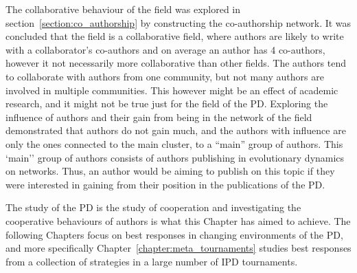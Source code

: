 The collaborative behaviour of the field was explored in
section~\ref{section:co_authorship} by constructing the co-authorship network.
It was concluded that the field is a collaborative field, where authors are
likely to write with a collaborator's co-authors and on average an author has 4
co-authors, however it not necessarily more collaborative than other fields. The
authors tend to collaborate with authors from one community, but not many
authors are involved in multiple communities. This however
might be an effect of academic research, and it might not be true just for the
field of the PD. Exploring the influence of authors and their gain from being in
the network of the field demonstrated that authors do not gain much, and the
authors with influence are only the ones connected to the main cluster, to a
``main'' group of authors. This `main'' group of authors consists of authors
publishing in evolutionary dynamics on networks. Thus, an author would be aiming
to publish on this topic if they were interested in gaining from their position
in the publications of the PD.

The study of the PD is the study of cooperation and investigating the
cooperative behaviours of authors is what this Chapter has aimed to achieve. The
following Chapters focus on best responses in changing environments of the PD,
and more specifically Chapter~\ref{chapter:meta_tournaments} studies best
responses from a collection of strategies in a large number of IPD tournaments.
